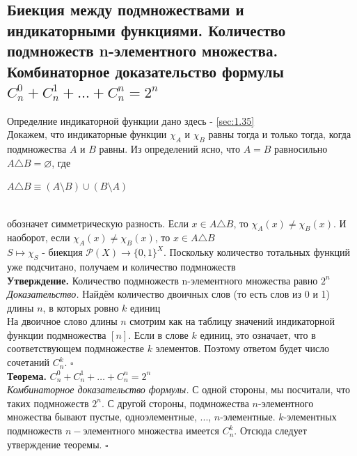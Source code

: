 \documentclass[a4paper]{article}
\newcommand{\qed}{\hfill$\square$}
\begin{document}
\subsection{Биекция между подмножествами и индикаторными функциями. Количество подмножеств n-элементного множества. Комбинаторное доказательство формулы $C^0_n+C^1_n+\ldots+C^n_n=2^n$}
Определние индикаторной функции дано здесь -  \ref{sec:1.35}\\[2mm]
\indent Докажем, что индикаторные функции $\chi_A$ и $\chi_B$ равны тогда и только тогда, когда подмножества $A$ и $B$ равны. Из определений ясно, что $A = B$ равносильно $A\triangle B=\varnothing$, где\\[2mm]
\centerline{$A\triangle B\equiv(A\setminus B)\cup(B\setminus A)$}\\[2mm]
обозначет симметрическую разность. Если $x\in A\triangle B$, то $\chi_A(x)\ne\chi_B(x)$. И наоборот, если $\chi_A(x)\ne\chi_B(x)$, то $x\in A\triangle B$\\[2mm]
\indent $S\mapsto\chi_S$ - биекция $\mathcal{P}(X)\rightarrow\{0,1\}^X$. Поскольку количество тотальных функций уже подсчитано, получаем и количество подмножеств\\[2mm]
\textbf{Утверждение.} Количество подмножеств n-элементного множества равно $2^n$\\[2mm]
\textit{Доказательство.} Найдём количество двоичных слов (то есть слов из 0 и 1) длины $n$, в которых ровно $k$ единиц\\[2mm]
\indent На двоичное слово длины $n$ смотрим как на таблицу значений индикаторной функции подмножества $[n]$. Если в слове $k$ единиц, это означает, что в соответствующем подмножестве $k$ элементов. Поэтому ответом будет число сочетаний $C_n^k$. \qed\\[2mm]
\textbf{Теорема.} $C^0_n+C^1_n+\ldots+C^n_n=2^n$\\[2mm]
\textit{Комбинаторное доказательство формулы.} С одной стороны, мы посчитали, что таких подмножеств $2^n$. С другой стороны, подмножества $n$-элементного множества бывают пустые, одноэлементные, ..., $n$-элементные. $k$-элементных подмножеств $n-$элементного множества имеется $C_n^k$. Отсюда следует утверждение теоремы. \qed
\end{document}
